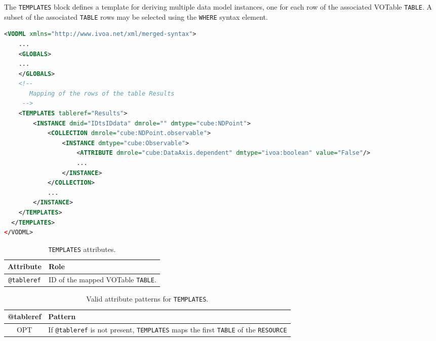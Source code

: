The \texttt{TEMPLATES} block defines a template for deriving multiple data model instances,
one for each row of the associated VOTable \texttt{TABLE}.  A subset of the associated
\texttt{TABLE} rows may be selected using the \texttt{WHERE} syntax element.

\begin{lstlisting}[caption={Example of a \texttt{TEMPLATES} block mapping the rows of the table \texttt{Results} (see in \ref{TEMPLATES_snippet}).},language=XML]
<VODML xmlns="http://www.ivoa.net/xml/merged-syntax">
    ...
    <GLOBALS>
    ...
    </GLOBALS>
    <!--
       Mapping of the rows of the table Results
     -->  
    <TEMPLATES tableref="Results">
        <INSTANCE dmid="IDtsIDdata" dmrole="" dmtype="cube:NDPoint">
            <COLLECTION dmrole="cube:NDPoint.observable">
                <INSTANCE dmtype="cube:Observable">
                    <ATTRIBUTE dmrole="cube:DataAxis.dependent" dmtype="ivoa:boolean" value="False"/>
                    ...
                </INSTANCE>
            </COLLECTION>
            ...
        </INSTANCE>
    </TEMPLATES>
  </TEMPLATES>
</VODML>
\end{lstlisting}

\begin{table}[!htbp]
  \small
  \centering
  \begin{tabulary}{\linewidth}{|c|J|}
    \hline 
         \textbf{Attribute} & 
         \textbf {Role}\\
    \hline
    \hline  
         \texttt{@tableref} & 
         ID of the mapped VOTable \texttt{TABLE}.\\
    \hline 
  \end{tabulary}
  \caption{\texttt{TEMPLATES} attributes.} 
  \label{tbl:templates-att}
\end{table}

\begin{table}[!htbp]
  \small
  \centering
  \begin{tabulary}{\linewidth}{|c|J|}
    \hline 
        \textbf{@tableref} &
        \textbf{Pattern}\\
    \hline
    \hline  
        OPT &           
        If \texttt{@tableref} is not present, \texttt{TEMPLATES} maps the first \texttt{TABLE} of the \texttt{RESOURCE}\\
    \hline 
  \end{tabulary}
  \caption{Valid attribute patterns for  \texttt{TEMPLATES}.} 
  \label{tbl:templates-pattern}
 \end{table}

